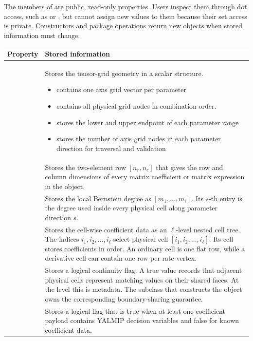 The members of  are public, read-only properties. Users inspect them through dot access, such as  or , but cannot assign new values to them because their set access is private. Constructors and package operations return new objects when stored information must change.

\begin{tabularx}{\textwidth}{@{}p{}Y@{}}
    \toprule
    Property & Stored information \\
    \midrule
     & Stores the tensor-grid geometry in a scalar structure.
    \begin{itemize}
        \item {} contains one axis grid vector per parameter
        \item {} contains all physical grid nodes in combination order.
        \item {} stores the lower and upper endpoint of each parameter range
        \item {} stores the number of axis grid nodes in each parameter direction for traversal and validation
    \end{itemize}
    \\
     & Stores the two-element row $[n_r,n_c]$ that gives the row and column dimensions of every matrix coefficient or matrix expression in the object. \\
     & Stores the local Bernstein degree as $[m_1,\ldots,m_\ell]$. Its $s$-th entry is the degree used inside every physical cell along parameter direction $s$. \\
     & Stores the cell-wise coefficient data as an $\ell$-level nested cell tree. The indices $i_1,i_2,\ldots,i_\ell$ select physical cell $[i_1,i_2,\ldots,i_\ell]$. Its cell stores coefficients in  order. An ordinary cell is one flat row, while a derivative cell can contain one row per rate vertex. \\
     & Stores a logical continuity flag. A true value records that adjacent physical cells represent matching values on their shared faces. At the  level this is metadata. The subclass that constructs the object owns the corresponding boundary-sharing guarantee. \\
     & Stores a logical flag that is true when at least one coefficient payload contains YALMIP decision variables and false for known coefficient data. \\

\end{tabularx}
